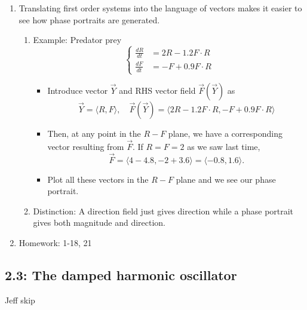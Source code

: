 \documentclass{article}
\begin{document}
\begin{enumerate}

\item Translating first order systems into the language of vectors makes it easier to see how phase portraits are generated.
\begin{enumerate}
\item Example: Predator prey
\[
\begin{cases}
\frac{dR}{dt} &= 2R-1.2 F\cdot R\\
\frac{dF}{dt} &= -F+0.9 F \cdot R 
\end{cases}
\]
\begin{itemize}
\item Introduce vector $\vec{Y}$ and RHS vector field $\vec{F}(\vec{Y})$ as
\[
\vec{Y} = \langle R, F \rangle, \quad \vec{F}(\vec{Y}) = \langle 2R-1.2 F \cdot R, -F+0.9 F \cdot R  \rangle
\]
\item Then, at any point in the $R-F$ plane, we have a corresponding vector resulting from $\vec{F}$. If $R=F=2$ as we saw last time, 
\[
\vec{F} = \langle 4-4.8, -2+3.6 \rangle = \langle -0.8, 1.6 \rangle.
\]
\item Plot all these vectors in the $R-F$ plane and we see our phase portrait.
\end{itemize}

\item Distinction: A direction field just gives direction while a phase portrait gives both magnitude and direction.

\end{enumerate}

\item Homework: 1-18, 21

\end{enumerate}

\subsection{2.3: The damped harmonic oscillator}
Jeff skip
\end{document}
